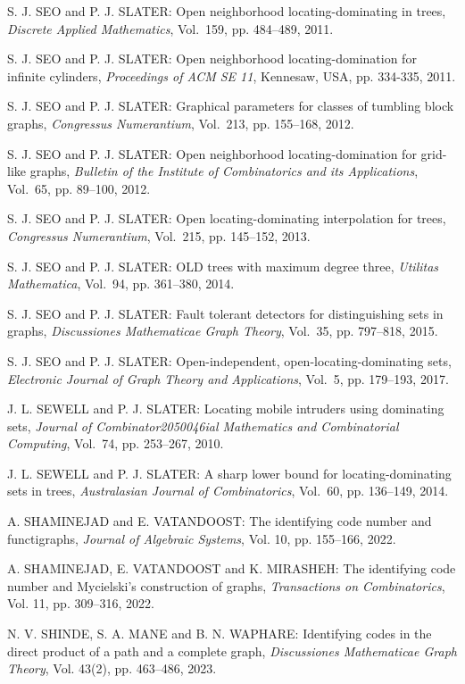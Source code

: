 \begin{thebibliography}{999}
S. J. SEO and P. J. SLATER: Open neighborhood locating-dominating in trees, {\it Discrete Applied Mathematics}, Vol.~159, pp. 484--489, 2011.

S. J. SEO and P. J. SLATER: Open neighborhood locating-domination for infinite cylinders, {\it Proceedings of ACM SE 11}, Kennesaw, USA, pp. 334-335, 2011.

S. J. SEO and P. J. SLATER: Graphical parameters for classes of tumbling block graphs, {\it Congressus Numerantium}, Vol.~213, pp. 155--168, 2012.

S. J. SEO and P. J. SLATER: Open neighborhood locating-domination for grid-like graphs, {\it Bulletin of the Institute of Combinatorics and its Applications}, Vol.~65, pp. 89--100, 2012.

S. J. SEO and P. J. SLATER: Open locating-dominating interpolation for trees, {\it Congressus Numerantium}, Vol.~215, pp. 145--152, 2013.

S. J. SEO and P. J. SLATER: OLD trees with maximum degree three, {\it Utilitas Mathematica}, Vol.~94, pp. 361--380, 2014.

S. J. SEO and P. J. SLATER: Fault tolerant detectors for distinguishing sets in graphs, {\it Discussiones Mathematicae Graph Theory}, Vol.~35, pp. 797--818, 2015.

S. J. SEO and P. J. SLATER: Open-independent, open-locating-dominating sets, {\it Electronic Journal of Graph Theory and Applications}, Vol.~5, pp. 179--193, 2017.

J. L. SEWELL and P. J. SLATER: Locating mobile intruders using dominating sets, {\it Journal of Combinator2050046ial Mathematics and Combinatorial Computing}, Vol.~74, pp. 253--267, 2010.

J. L. SEWELL and P. J. SLATER: A sharp lower bound for locating-dominating sets in trees, {\it Australasian Journal of Combinatorics}, Vol.~60, pp. 136--149, 2014.

A. SHAMINEJAD and E. VATANDOOST: The identifying code number and functigraphs, {\it Journal of Algebraic Systems}, Vol. 10, pp. 155--166, 2022.

A. SHAMINEJAD, E. VATANDOOST and K. MIRASHEH: The identifying code number and Mycielski's construction of graphs, {\it Transactions on Combinatorics}, Vol. 11, pp. 309--316, 2022.

N. V. SHINDE, S. A. MANE and B. N. WAPHARE: Identifying codes in the direct product of a path and a complete graph, {\it Discussiones Mathematicae Graph Theory}, Vol. 43(2), pp. 463--486, 2023.


\end{thebibliography}
